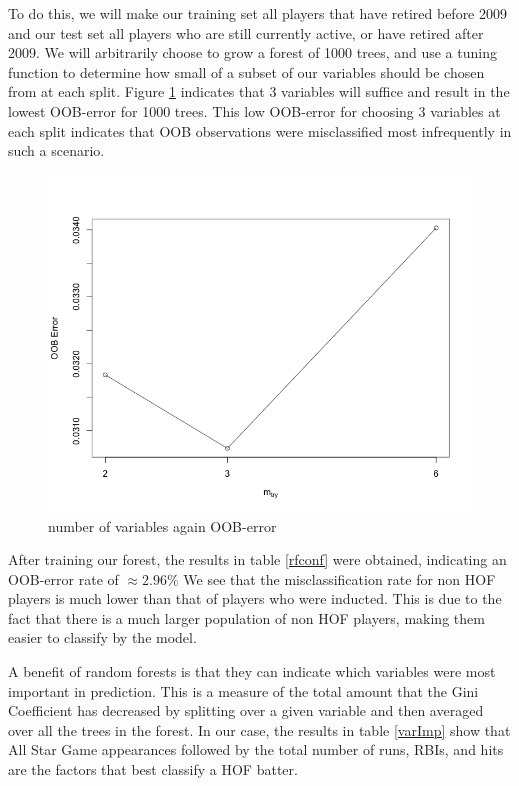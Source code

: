 \documentclass[preprint,12pt]{elsarticle}
\begin{document}
To do this, we will make our training set all players that have retired before 2009 and our test set all players who are still currently active, or have retired after 2009. We will arbitrarily choose to grow a forest of 1000 trees, and use a tuning function to determine how small of a subset of our variables should be chosen from at each split. Figure \ref{mtry} indicates that 3 variables will suffice and result in the lowest OOB-error for 1000 trees. This low OOB-error for choosing 3 variables at each split indicates that OOB observations were misclassified most infrequently in such a scenario.

\begin{figure}[h]
       \centering 
       \includegraphics[width=0.85\linewidth]{mtry}
       \caption{number of variables again OOB-error}
       \label{mtry}
 \end{figure}

After training our forest, the results in table \ref{rfconf} were obtained, indicating an OOB-error rate of $\approx 2.96\%$ We see that the misclassification rate for non HOF players is much lower than that of players who were inducted. This is due to the fact that there is a much larger population of non HOF players, making them easier to classify by the model. 

A benefit of random forests is that they can indicate which variables were most important in prediction. This is a measure of the total amount that the Gini Coefficient has decreased by splitting over a given variable and then averaged over all the trees in the forest. In our case, the results in table \ref{varImp} show that All Star Game appearances followed by the total number of runs, RBIs, and hits are the factors that best classify a HOF batter.
\end{document}
